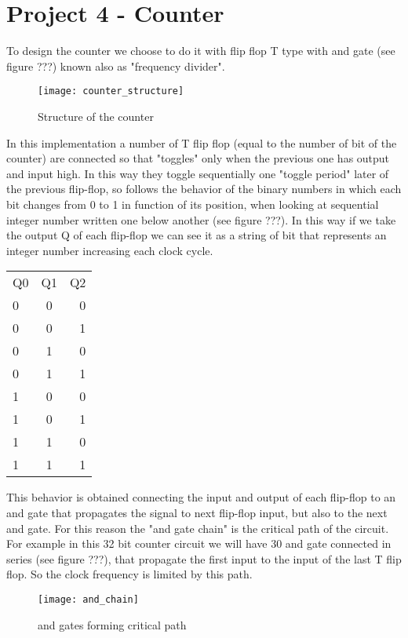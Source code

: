 \section{Project 4 - Counter}

To design the counter we choose to do it with flip flop T type with and gate (see figure ???) known also as "frequency divider".

\begin{figure}
    \centering
    \texttt{[image: counter\_structure]}
    \caption{Structure of the counter}
    \label{counterstructure}
\end{figure}

In this implementation a number of T flip flop (equal to the number of bit of the counter) are connected so that "toggles" only when the previous one has output and input high. In this way they toggle sequentially one "toggle period" later of the previous flip-flop, so follows the behavior of the binary numbers in which each bit changes from 0 to 1 in function of its position, when looking at sequential integer number written one below another (see figure ???). In this way if we take the output Q of each flip-flop we can see it as a string of bit that represents an integer number increasing each clock cycle.

\begin{tabular}{ l | c | r }
  Q0 & Q1 & Q2 \\
  0 & 0 & 0 \\
  0 & 0 & 1 \\
  0 & 1 & 0 \\
  0 & 1 & 1 \\
  1 & 0 & 0 \\
  1 & 0 & 1 \\
  1 & 1 & 0 \\
  1 & 1 & 1 \\
\end{tabular}

This behavior is obtained connecting the input and output of each flip-flop to an and gate that propagates the signal to next flip-flop input, but also to the next and gate. For this reason the "and gate chain" is the critical path of the circuit. For example in this 32 bit counter circuit we will have 30 and gate connected in series (see figure ???), that propagate the first input to the input of the last T flip flop. So the clock frequency is limited by this path.

\begin{figure}
    \centering
    \texttt{[image: and\_chain]}
    \caption{and gates forming critical path}
    \label{andchain}
\end{figure}

